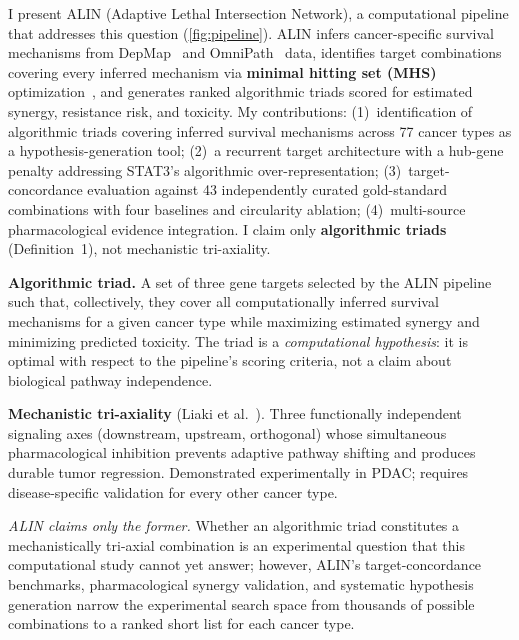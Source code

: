 \documentclass[times, twoside, watermark]{zHenriquesLab-StyleBioRxiv}
\begin{document}
I present ALIN (Adaptive Lethal Intersection Network), a computational pipeline that addresses this question (\cref{fig:pipeline}). ALIN infers cancer-specific survival mechanisms from DepMap~\cite{Dempster2021} and OmniPath~\cite{Turei2026} data, identifies target combinations covering every inferred mechanism via \textbf{minimal hitting set (MHS)} optimization~\cite{VeraLicona2013,Murakami2017}, and generates ranked algorithmic triads scored for estimated synergy, resistance risk, and toxicity. My contributions: (1)~identification of algorithmic triads covering inferred survival mechanisms across 77 cancer types as a hypothesis-generation tool; (2)~a recurrent target architecture with a hub-gene penalty addressing STAT3's algorithmic over-representation; (3)~target-concordance evaluation against 43 independently curated gold-standard combinations with four baselines and circularity ablation; (4)~multi-source pharmacological evidence integration. I claim only \textbf{algorithmic triads} (Definition~1), not mechanistic tri-axiality.

\begin{tcolorbox}[colback=gray!5, colframe=gray!60, title=\textbf{Definition 1: Algorithmic triad vs.\ mechanistic tri-axiality}, fonttitle=\small, fontlower=\small]
\textbf{Algorithmic triad.} A set of three gene targets selected by the ALIN pipeline such that, collectively, they cover all computationally inferred survival mechanisms for a given cancer type while maximizing estimated synergy and minimizing predicted toxicity. The triad is a \emph{computational hypothesis}: it is optimal with respect to the pipeline's scoring criteria, not a claim about biological pathway independence.

\textbf{Mechanistic tri-axiality} (Liaki et al.~\cite{Liaki2025}). Three functionally independent signaling axes (downstream, upstream, orthogonal) whose simultaneous pharmacological inhibition prevents adaptive pathway shifting and produces durable tumor regression. Demonstrated experimentally in PDAC; requires disease-specific validation for every other cancer type.

\emph{ALIN claims only the former.} Whether an algorithmic triad constitutes a mechanistically tri-axial combination is an experimental question that this computational study cannot yet answer; however, ALIN's target-concordance benchmarks, pharmacological synergy validation, and systematic hypothesis generation narrow the experimental search space from thousands of possible combinations to a ranked short list for each cancer type.
\end{tcolorbox}
\end{document}
